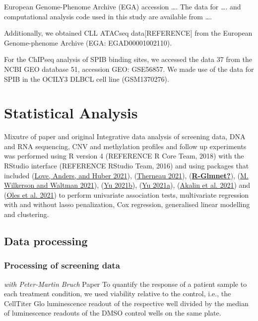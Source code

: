 \documentclass[11pt, a4paper, twosided]{book}
\begin{document}
European Genome-Phenome Archive (EGA) accession \ldots. The data for \ldots. and computational analysis code used in this study are available from \ldots.

Additionally, we obtained CLL ATACseq data{[}REFERENCE{]} from the European Genome-phenome Archive (EGA: EGAD00001002110).

For the ChIPseq analysis of SPIB binding sites, we accessed the data 37 from the NCBI GEO database 51, accession GEO: GSE56857. We made use of the data for SPIB in the OCILY3 DLBCL cell line (GSM1370276).

\hypertarget{statistical-analysis}{%
\section{Statistical Analysis}\label{statistical-analysis}}

Mixutre of paper and original
Integrative data analysis of screening data, DNA and RNA sequencing, CNV and methylation profiles and follow up experiments was performed using R version 4 (REFERENCE R Core Team, 2018) with the RStudio interface (REFERENCE RStudio Team, 2016) and using packages that included (\protect\hyperlink{ref-R-DESeq2}{Love, Anders, and Huber 2021}), (\protect\hyperlink{ref-R-survival}{Therneau 2021}), (\protect\hyperlink{ref-R-Glmnet}{\textbf{R-Glmnet?}}), (\protect\hyperlink{ref-R-ConsensusClusterPlus}{M. Wilkerson and Waltman 2021}), (\protect\hyperlink{ref-R-clusterProfiler}{Yu 2021b}), (\protect\hyperlink{ref-R-ChIPseeker}{Yu 2021a}), (\protect\hyperlink{ref-R-genomation}{Akalin et al. 2021}) and (\protect\hyperlink{ref-R-BloodCancerMultiOmics2017}{Oles et al. 2021}) to perform univariate association tests, multivariate regression with and without lasso penalization, Cox regression, generalised linear modelling and clustering.

\hypertarget{data-processing}{%
\subsection{Data processing}\label{data-processing}}

\hypertarget{processing-of-screening-data}{%
\subsubsection{Processing of screening data}\label{processing-of-screening-data}}

\emph{with Peter-Martin Bruch} Paper
To quantify the response of a patient sample to each treatment condition, we used viability relative to the control, i.e., the CellTiter Glo luminescence readout of the respective well divided by the median of luminescence readouts of the DMSO control wells on the same plate.
\end{document}
